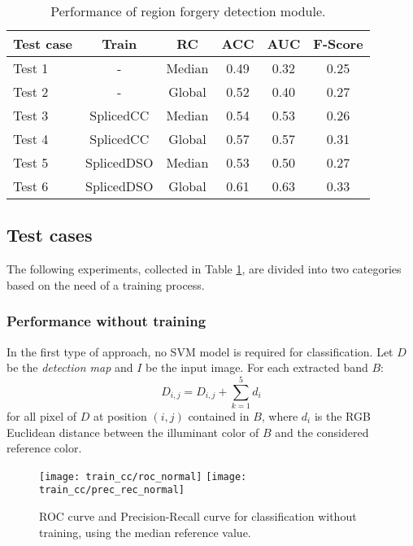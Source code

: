 \begin{table}[h!]
\centering
\begin{tabular}{l c c c c c} 
\hline \hline 
\textbf{Test case} & \textbf{Train} & \textbf{RC} & \textbf{ACC} & \textbf{AUC} &\textbf{ F-Score} \\ [0.5ex]
\hline
Test 1 & - & Median & 0.49 & 0.32 & 0.25\\
Test 2 & - & Global & 0.52 & 0.40 & 0.27\\
Test 3 & SplicedCC & Median & 0.54 & 0.53 & 0.26\\
Test 4 & SplicedCC & Global & 0.57 & 0.57 & 0.31\\
Test 5 &	 SplicedDSO & Median & 0.53 & 0.50 & 0.27\\
Test 6 &	 SplicedDSO & Global & 0.61 & 0.63 & 0.33\\ [1ex]
\hline
\end{tabular}
\caption{Performance of region forgery detection module.}
\label{table:performanceregionaldet}
\end{table}

\subsection{Test cases}

The following experiments, collected in Table \ref{table:performanceregionaldet}, are divided into two categories based on the need of a training process.

\subsubsection{Performance without training}

In the first type of approach, no SVM model is required for classification. Let $D$ be the \emph{detection map} and $I$ be the input image. For each extracted band $B$:
$$
D_{i, j} = D_{i, j} + \sum_{k = 1}^{5} d_i
$$
for all pixel of $D$ at position $(i, j)$ contained in $B$, where $d_i$ is the RGB Euclidean distance between the illuminant color of $B$ and the considered reference color.

\begin{figure}[!htb]
  \texttt{[image: train\_cc/roc\_normal]}
\endminipage\hfill
{}
  \texttt{[image: train\_cc/prec\_rec\_normal]}
\endminipage
\caption{ROC curve and Precision-Recall curve for classification without training, using the median reference value.}\label{fig:regiondetnormal}
\end{figure}

